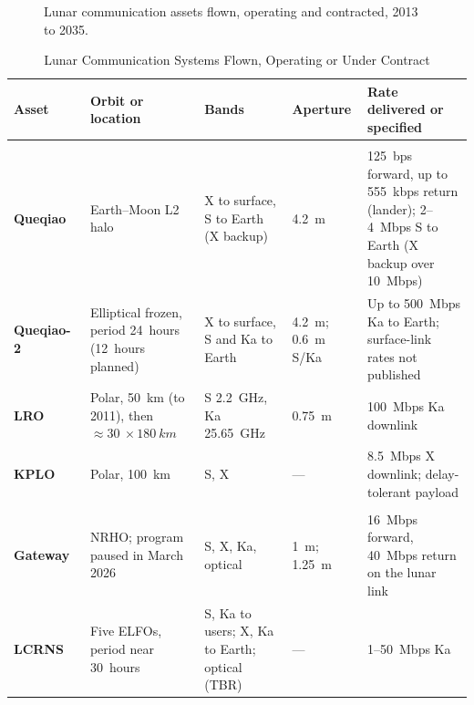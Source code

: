 \documentclass{IEEEoj}
\renewcommand{\arraystretch}{1.25}
\begin{document}
\begin{figure}[!t]
\centering
\resizebox{\textwidth}{!}{}
\caption{Lunar communication assets flown, operating and contracted, 2013 to 2035.}
\label{fig:assets_timeline}
\end{figure}

\begin{table}[!t]
\caption{Lunar Communication Systems Flown, Operating or Under Contract}
\label{tab:assets}
\centering
\footnotesize
\renewcommand{\arraystretch}{1.12}
\begin{tabularx}{\textwidth}{@{}>{\raggedright\arraybackslash\bfseries}p{3.5cm}>{\raggedright\arraybackslash}p{3.3cm}>{\raggedright\arraybackslash}p{3.1cm}>{\raggedright\arraybackslash}p{1.5cm}>{\raggedright\arraybackslash}X}
\toprule
\rowcolor{tabhead}\textbf{Asset} & \textbf{Orbit or location} & \textbf{Bands} & \textbf{Aperture} & \textbf{Rate delivered or specified} \\
\midrule
\rowcolor{tabgroup}\multicolumn{5}{@{}l}{\emph{Relays and orbiters, flown or operating}}\\
Queqiao~\cite{chen_ce4_relay,queqiao_relay_review_2021} & Earth--Moon L2 halo & X to surface, S to Earth (X backup) & \SI{4.2}{m} & \SI{125}{bps} forward, up to \SI{555}{kbps} return (lander); \SI{2}{}--\SI{4}{Mbps} S to Earth (X backup over \SI{10}{Mbps}) \\
Queqiao-2~\cite{cnsa_queqiao2,planetary_queqiao2,hong_lovex_2026,lei_queqiao2_data_2026} & Elliptical frozen, period \SI{24}{hours} (\SI{12}{hours} planned) & X to surface, S and Ka to Earth & \SI{4.2}{m}; \SI{0.6}{m} S/Ka & Up to \SI{500}{Mbps} Ka to Earth; surface-link rates not published \\
LRO~\cite{lro_ka_analysis} & Polar, \SI{50}{km} (to 2011), then ${\approx}\SI{30}{}\times\SI{180}{km}$ & S \SI{2.2}{GHz}, Ka \SI{25.65}{GHz} & \SI{0.75}{m} & \SI{100}{Mbps} Ka downlink \\
KPLO~\cite{kim_kplo_dtn} & Polar, \SI{100}{km} & S, X & --- & \SI{8.5}{Mbps} X downlink; delay-tolerant payload \\
\addlinespace[2pt]
\rowcolor{tabgroup}\multicolumn{5}{@{}l}{\emph{Relay and navigation systems, planned or under contract}}\\
Gateway~\cite{gateway_comm,nasa_ignition2026} & NRHO; program paused in March 2026 & S, X, Ka, optical & \SI{1}{m}; \SI{1.25}{m} & \SI{16}{Mbps} forward, \SI{40}{Mbps} return on the lunar link \\
LCRNS~\cite{lcrns_ref_const,nasa_lunar_relay_srd} & Five ELFOs, period near \SI{30}{hours} & S, Ka to users; X, Ka to Earth; optical (TBR) & --- & \SI{1}{}--\SI{50}{Mbps} Ka \\

\end{tabularx}
\end{table}
\end{document}
